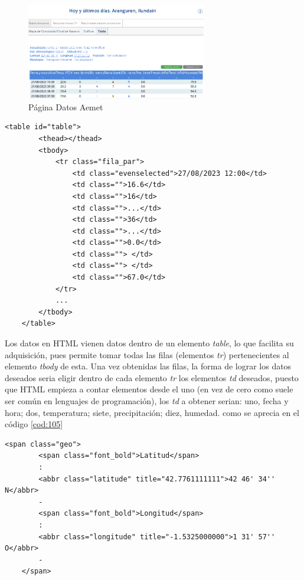 \begin{figure} [H]
	\centering
	\includegraphics[width=0.7\textwidth]{fig/AemetData.png}
	\caption[Página Aemet de la estación en Aranguren (Navarra)]{Página Datos Aemet}
	\label{fig:ej3}
\end{figure}

\begin{lstlisting}[basicstyle=\footnotesize, caption={HTML tabla datos en Aemet}, label=cod:105]
	<table id="table">
		<thead></thead>
		<tbody>
			<tr class="fila_par">
				<td class="evenselected">27/08/2023 12:00</td>
				<td class="">16.6</td>
				<td class="">16</td>
				<td class="">...</td>
				<td class="">36</td>
				<td class="">...</td>
				<td class="">0.0</td>
				<td class=""> </td>
				<td class=""> </td>
				<td class="">67.0</td>
			</tr>
			...
		</tbody>
	</table>
\end{lstlisting}

Los datos en HTML vienen datos dentro de un elemento \textit{table}, lo que facilita su adquisición, pues permite tomar todas las filas (elementos \textit{tr}) pertenecientes al elemento \textit{tbody} de esta. Una vez obtenidas las filas, la forma de lograr los datos deseados seria eligir dentro de cada elemento \textit{tr} los elementos \textit{td} deseados, puesto que HTML empieza a contar elementos desde el uno (en vez de cero como suele ser común en lenguajes de programación), los \textit{td} a obtener serian: uno, fecha y hora; dos, temperatura; siete, precipitación; diez, humedad. como se aprecia en el código \ref{cod:105}

\begin{lstlisting}[basicstyle=\footnotesize, caption={HTML coordenadas en Aemet}, label=cod:106]
	<span class="geo">
		<span class="font_bold">Latitud</span>
		:
		<abbr class="latitude" title="42.7761111111">42 46' 34'' N</abbr>
		-
		<span class="font_bold">Longitud</span>
		:
		<abbr class="longitude" title="-1.5325000000">1 31' 57'' O</abbr>
		-
	</span>
\end{lstlisting}

